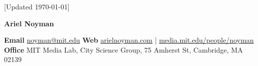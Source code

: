 \documentclass[10pt]{book}
\newcommand{\myname}{Ariel Noyman}
\begin{document}
\pagestyle{empty}
\begin{center}
    \vfill
    \tiny {[Updated \monthyeardate\today]}
\end{center}
\vspace{2em}


\begin{flushleft}
    {\Huge\bfseries {\myname}}
\end{flushleft}


\textbf{Email} \href{mailto:noyman@mit.edu}{noyman@mit.edu}
\newline
\textbf{Web} \href{http://www.arielnoyman.com/}{arielnoyman.com} | \href{https://www.media.mit.edu/people/noyman/overview/}{media.mit.edu/people/noyman}
\newline
\textbf{Office} MIT Media Lab, City Science Group, 75 Amherst St, Cambridge, MA 02139 













\end{document}

